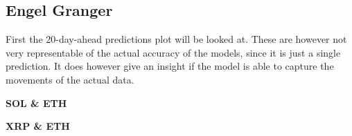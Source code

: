 \subsection{Engel Granger}
First the 20-day-ahead predictions plot will be looked at. These are however not very representable of the actual accuracy of the models, since it is just a single prediction. It does however give an insight if the model is able to capture the movements of the actual data.\\
\begin{center}
    \textbf{SOL \& ETH}
\end{center}
\begin{figure}[H]
  \centering
  \quad
  \label{}
\end{figure}
\begin{center}
    \textbf{XRP \& ETH}
\end{center}
